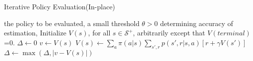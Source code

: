 \begin{algorithm}[H]
\label{alg:iterative_policy_evaluation}
\caption{Iterative Policy Evaluation(In-place)}
\begin{algorithmic}[1]
\Require the policy to be evaluated, a small threshold $\theta > 0$ determining accuracy of estimation, Initialize $V(s)$, for all $s \in \mathcal{S}^+$, arbitrarily except that $V(terminal)$=0.
\Statex
\Repeat
	\State \begin{math}\Delta \leftarrow 0\end{math}
		\State \begin{math}v \leftarrow V(s)\end{math}
		\State \begin{math}V(s) \leftarrow \sum_a \pi(a|s)\sum_{s',r}p(s', r|s, a)[r+\gamma V(s')]\end{math}
		\State \begin{math}\Delta \leftarrow \max(\Delta , |v-V(s)|)\end{math}
	\EndFor
\Until{\begin{math} \Delta < \theta \end{math}}
\end{algorithmic}
\end{algorithm}


